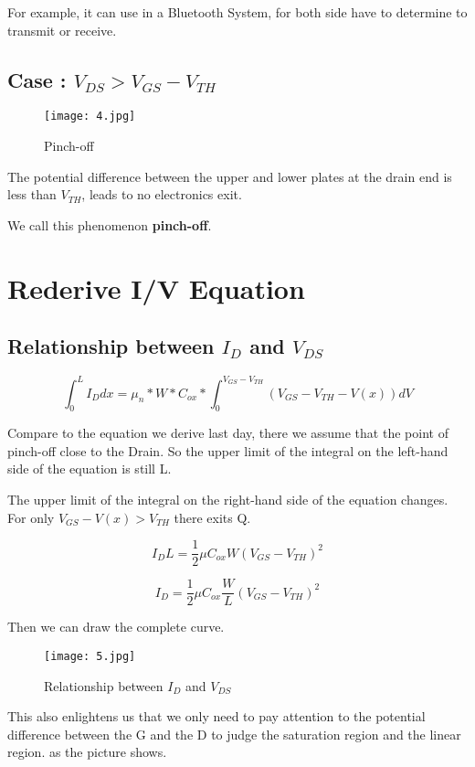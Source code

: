 \documentclass[fontset=windows]{article}
\begin{document}
For example, it can use in a Bluetooth System, for both side have to determine to transmit or receive.

\subsection*{Case \uppercase\expandafter{}: $V_{DS}>V_{GS}-V_{TH}$}

\begin{figure}[htbp]
    \centering
    \texttt{[image: 4.jpg]}
    \captionsetup{labelformat=empty}
    \caption{Pinch-off}
    \label{4}
\end{figure}

The potential difference between the upper and lower plates at the drain end is less than $V_{TH}$, 
leads to no electronics exit.

We call this phenomenon \textbf{pinch-off}. 

\section*{Rederive I/V Equation}

\subsection*{Relationship between $I_D$ and $V_{DS}$}

$$\int_{0}^{L} I_Ddx=\mu_{n}*W*C_{ox}*\int_{0}^{V_{GS}-V_{TH}} (V_{GS}-V_{TH}-V(x))dV$$

Compare to the equation we derive last day, 
there we assume that the point of pinch-off close to the Drain. So the upper limit of the integral on the left-hand side of the equation is still L. 

The upper limit of the integral on the right-hand side of the equation changes. 
For only $V_{GS}-V(x)>V_{TH}$ there exits Q. 

$$I_DL=\frac{1}{2} \mu C_{ox}W(V_{GS}-V_{TH})^2$$

$$I_D=\frac{1}{2} \mu C_{ox}\frac{W}{L}(V_{GS}-V_{TH})^2$$

Then we can draw the complete curve. 

\begin{figure}[htbp]
    \centering
    \texttt{[image: 5.jpg]}
    \captionsetup{labelformat=empty}
    \caption{Relationship between $I_D$ and $V_{DS}$}
    \label{5}
\end{figure}

This also enlightens us that we only need to pay attention to the potential difference between the G and the D 
to judge the saturation region and the linear region. as the picture shows. 
\end{document}
